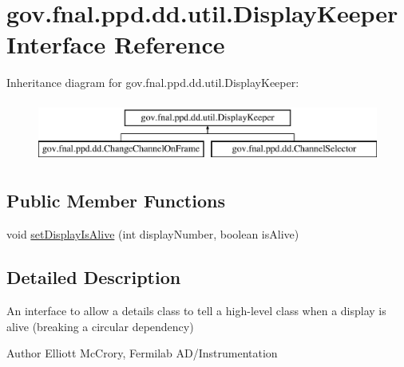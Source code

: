 \hypertarget{interfacegov_1_1fnal_1_1ppd_1_1dd_1_1util_1_1DisplayKeeper}{\section{gov.\-fnal.\-ppd.\-dd.\-util.\-Display\-Keeper Interface Reference}
\label{interfacegov_1_1fnal_1_1ppd_1_1dd_1_1util_1_1DisplayKeeper}
}
Inheritance diagram for gov.\-fnal.\-ppd.\-dd.\-util.\-Display\-Keeper\-:\begin{figure}[H]
\begin{center}
\leavevmode
\includegraphics[height=2.000000cm]{interfacegov_1_1fnal_1_1ppd_1_1dd_1_1util_1_1DisplayKeeper}
\end{center}
\end{figure}
\subsection*{Public Member Functions}
\begin{DoxyCompactItemize}
\item 
void \hyperlink{interfacegov_1_1fnal_1_1ppd_1_1dd_1_1util_1_1DisplayKeeper_a6af1f9ba442235e65e2d333ea7b28be3}{set\-Display\-Is\-Alive} (int display\-Number, boolean is\-Alive)
\end{DoxyCompactItemize}


\subsection{Detailed Description}
An interface to allow a details class to tell a high-\/level class when a display is alive (breaking a circular dependency)

\begin{DoxyAuthor}{Author}
Elliott Mc\-Crory, Fermilab A\-D/\-Instrumentation 
\end{DoxyAuthor}



